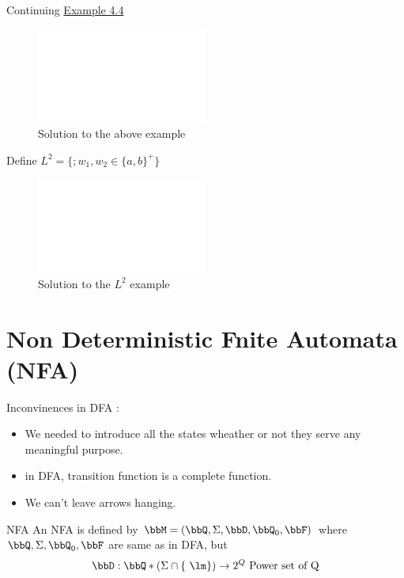 
Continuing \href{Example 4.4}{Example 4.4}

\begin{figure}[!h]
    \centering
    \includegraphics[width=0.5\textwidth]{figures/default.png}
    \caption{Solution to the above example}
\end{figure}

Define $L^2 = \{ ; w_1, w_2 \in \{a, b\}^{+} \}$

\begin{figure}[!h]
    \centering
    \includegraphics[width=0.5\textwidth]{figures/default.png}
    \caption{Solution to the $L^2$ example}
\end{figure}

\section{Non Deterministic Fnite Automata (NFA)}

Inconvinences in DFA : 

\begin{itemize}
    \item We needed to introduce all the states wheather or not they serve any meaningful purpose. 
    \item in DFA, transition function is a complete function. 
    \item We can't leave arrows hanging. 
\end{itemize}


\begin{definition}{NFA}
    An NFA is defined by $\bbM = ( \bbQ, \Sigma, \bbD, \bbQ_0, \bbF )$ where $\bbQ, \Sigma, \bbQ_0, \bbF$ are same as in DFA, but $$
    \bbD : \bbQ * (\Sigma \cap \{\ \lm \} ) \rightarrow 2^{Q} \text{ Power set of Q}$$
\end{definition}

